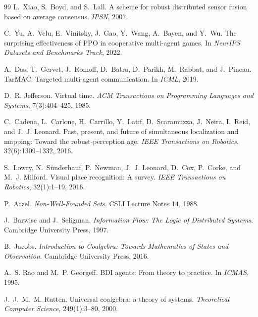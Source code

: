 \documentclass{article}
\begin{document}
\begin{thebibliography}{99}
L.~Xiao, S.~Boyd, and S.~Lall.
\newblock A scheme for robust distributed sensor fusion based on average consensus.
\newblock \emph{IPSN}, 2007.

C.~Yu, A.~Velu, E.~Vinitsky, J.~Gao, Y.~Wang, A.~Bayen, and Y.~Wu.
\newblock The surprising effectiveness of PPO in cooperative multi-agent games.
\newblock In \emph{NeurIPS Datasets and Benchmarks Track}, 2022.

A.~Das, T.~Gervet, J.~Romoff, D.~Batra, D.~Parikh, M.~Rabbat, and
J.~Pineau.
\newblock TarMAC: Targeted multi-agent communication.
\newblock In \emph{ICML}, 2019.

D.~R. Jefferson.
\newblock Virtual time.
\newblock \emph{ACM Transactions on Programming Languages and Systems},
7(3):404--425, 1985.

C.~Cadena, L.~Carlone, H.~Carrillo, Y.~Latif, D.~Scaramuzza,
J.~Neira, I.~Reid, and J.~J. Leonard.
\newblock Past, present, and future of simultaneous localization and
mapping: Toward the robust-perception age.
\newblock \emph{IEEE Transactions on Robotics}, 32(6):1309--1332, 2016.

S.~Lowry, N.~S\"underhauf, P.~Newman, J.~J. Leonard, D.~Cox,
P.~Corke, and M.~J. Milford.
\newblock Visual place recognition: A survey.
\newblock \emph{IEEE Transactions on Robotics}, 32(1):1--19, 2016.

P.~Aczel.
\newblock \emph{Non-Well-Founded Sets}.
\newblock CSLI Lecture Notes 14, 1988.

J.~Barwise and J.~Seligman.
\newblock \emph{Information Flow: The Logic of Distributed Systems}.
\newblock Cambridge University Press, 1997.

B.~Jacobs.
\newblock \emph{Introduction to Coalgebra: Towards Mathematics of States and Observation}.
\newblock Cambridge University Press, 2016.

A.~S. Rao and M.~P. Georgeff.
\newblock BDI agents: From theory to practice.
\newblock In \emph{ICMAS}, 1995.

J.~J.~M.~M. Rutten.
\newblock Universal coalgebra: a theory of systems.
\newblock \emph{Theoretical Computer Science}, 249(1):3--80, 2000.


\end{thebibliography}
\end{document}
